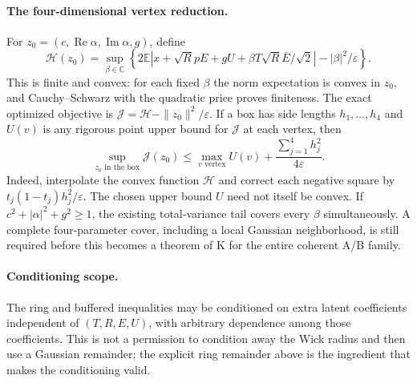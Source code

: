 \paragraph{The four-dimensional vertex reduction.}
For $z_0=(c,\operatorname{Re}\alpha,\operatorname{Im}\alpha,g)$, define
\[
\mathcal H(z_0)=\sup_{\beta\in\mathbb C}
\left\{2\mathbb E|x+\sqrt RpE+gU+\beta T\sqrt R\overline E/\sqrt2|
 -|\beta|^2/\varepsilon\right\}.
\]
This is finite and convex: for each fixed $\beta$ the norm expectation is convex in $z_0$, and Cauchy--Schwarz with the quadratic price proves finiteness. The exact optimized objective is $\mathcal J=\mathcal H-\|z_0\|^2/\varepsilon$. If a box has side lengths $h_1,\ldots,h_4$ and $U(v)$ is any rigorous point upper bound for $\mathcal J$ at each vertex, then
\[
\sup_{z_0\text{ in the box}}\mathcal J(z_0)
\le\max_{v\text{ vertex}}U(v)+\frac{\sum_{j=1}^4h_j^2}{4\varepsilon}.
\]
Indeed, interpolate the convex function $\mathcal H$ and correct each negative square by $t_j(1-t_j)h_j^2/\varepsilon$. The chosen upper bound $U$ need not itself be convex. If $c^2+|\alpha|^2+g^2\ge1$, the existing total-variance tail covers every $\beta$ simultaneously. A complete four-parameter cover, including a local Gaussian neighborhood, is still required before this becomes a theorem of K for the entire coherent A/B family.

\paragraph{Conditioning scope.}
The ring and buffered inequalities may be conditioned on extra latent coefficients independent of $(T,R,E,U)$, with arbitrary dependence among those coefficients. This is not a permission to condition away the Wick radius and then use a Gaussian remainder; the explicit ring remainder above is the ingredient that makes the conditioning valid.

